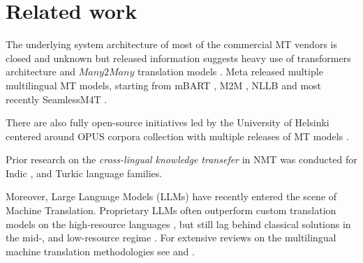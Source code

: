\section{Related work}
\label{sect:related_work}

The underlying system architecture of most of the commercial MT vendors is closed and unknown but released information suggests heavy use of transformers architecture \cite{NIPS2017_3f5ee243} and $Many2Many$ translation models \cite{johnson-etal-2017-googles}. Meta released multiple multilingual MT models, starting from mBART \cite{liu-etal-2020-multilingual-denoising}, M2M \cite{10.5555/3546258.3546365}, NLLB \cite{nllb2022} and most recently SeamlessM4T \cite{seamlessm4t2023}.

There are also fully open-source initiatives led by the University of Helsinki centered around OPUS corpora collection \cite{tiedemann-2012-parallel} with multiple releases of MT models \cite{tiedemann-thottingal-2020-opus, tiedemann-2020-tatoeba}.

Prior research on the \emph{cross-lingual knowledge transefer} in NMT was conducted for Indic \cite{10.1145/3587932}, and Turkic \cite{mirzakhalov-etal-2021-evaluating} language families.

Moreover, Large Language Models (LLMs) have recently entered the scene of Machine Translation. Proprietary LLMs often outperform custom translation models on the high-resource languages \cite{kocmi-etal-2023-findings}, but still lag behind classical solutions in the mid-, and low-resource regime \cite{hendy2023good, zhu2023multilingual}. For extensive reviews on the multilingual machine translation methodologies see \citet{kocmi-2021} and \citet{10.1145/3406095}.